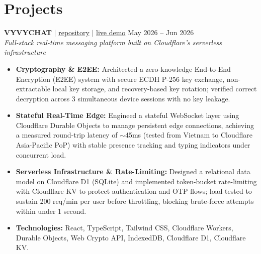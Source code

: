 \documentclass[10pt,a4paper]{article}
\begin{document}
\section*{Projects}

\noindent \textbf{VYVYCHAT} $|$ \href{https://github.com/vyquochuy/vyvychat}{repository} $|$ \href{https://vyvychat.myvault-service.workers.dev/}{live demo} \hfill May 2026 -- Jun 2026\\ \textit{Full-stack real-time messaging platform built on Cloudflare's serverless infrastructure}\\
\begin{itemize}[leftmargin=0.25in, nosep]
    \item \textbf{Cryptography \& E2EE:} Architected a zero-knowledge End-to-End Encryption (E2EE) system with secure ECDH P-256 key exchange, non-extractable local key storage, and recovery-based key rotation; verified correct decryption across 3 simultaneous device sessions with no key leakage.
    \item \textbf{Stateful Real-Time Edge:} Engineed a stateful WebSocket layer using Cloudflare Durable Objects to manage persistent edge connections, achieving a measured round-trip latency of $\sim$45ms (tested from Vietnam to Cloudflare Asia-Pacific PoP) with stable presence tracking and typing indicators under concurrent load.
    \item \textbf{Serverless Infrastructure \& Rate-Limiting:} Designed a relational data model on Cloudflare D1 (SQLite) and implemented token-bucket rate-limiting with Cloudflare KV to protect authentication and OTP flows; load-tested to sustain 200 req/min per user before throttling, blocking brute-force attempts within under 1 second.
    \item \textbf{Technologies:} React, TypeScript, Tailwind CSS, Cloudflare Workers, Durable Objects, Web Crypto API, IndexedDB, Cloudflare D1, Cloudflare KV.
\end{itemize}
\vspace{10pt}
\end{document}
